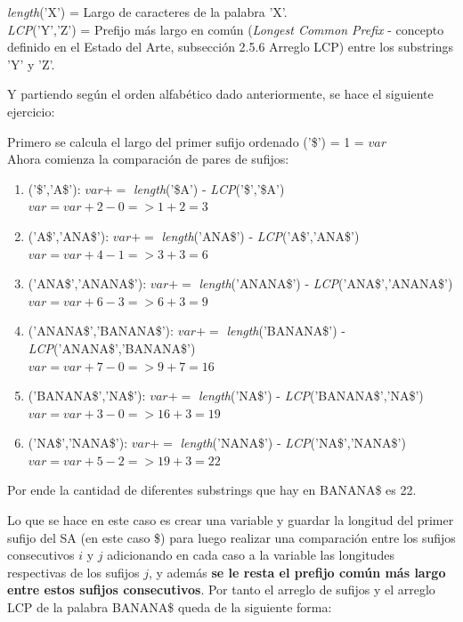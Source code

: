 {\it{length}}('X') = Largo de caracteres de la palabra 'X'.\\
{\it{LCP}}('Y','Z') = Prefijo más largo en común ({\it{Longest Common Prefix}} - concepto definido en el Estado del Arte, subsección 2.5.6 Arreglo LCP) entre los substrings 'Y' y 'Z'.

Y partiendo según el orden alfabético dado anteriormente, se hace el siguiente ejercicio:

Primero se calcula el largo del primer sufijo ordenado ('\$') = 1 = $var$\\
Ahora comienza la comparación de pares de sufijos:
\begin{enumerate}
	\item ('\$','A\$'): $var +=$ {\it{length}}('\$A') - {\it{LCP}}('\$','\$A')\\
	$var=var+2-0 =>  1+2=3$

	\item ('A\$','ANA\$'): $var +=$ {\it{length}}('ANA\$') - {\it{LCP}}('A\$','ANA\$')\\
	$var=var+4-1 =>  3+3=6$
	
	\item ('ANA\$','ANANA\$'): $var +=$ {\it{length}}('ANANA\$') - {\it{LCP}}('ANA\$','ANANA\$')\\
	$var=var+6-3 =>  6+3=9$
	
	\item ('ANANA\$','BANANA\$'): $var +=$ {\it{length}}('BANANA\$') - {\it{LCP}}('ANANA\$','BANANA\$')\\
	$var=var+7-0 =>  9+7=16$
	
	\item ('BANANA\$','NA\$'): $var +=$ {\it{length}}('NA\$') - {\it{LCP}}('BANANA\$','NA\$')\\
	$var=var+3-0 =>  16+3=19$
	
	\item ('NA\$','NANA\$'): $var +=$ {\it{length}}('NANA\$') - {\it{LCP}}('NA\$','NANA\$')\\
	$var=var+5-2 =>  19+3=22$
	
\end{enumerate}

Por ende la cantidad de diferentes substrings que hay en BANANA\$ es 22.

Lo que se hace en este caso es crear una variable y guardar la longitud del primer sufijo del SA (en este caso \$) para luego realizar una comparación entre los sufijos consecutivos $i$ y $j$ adicionando en cada caso a la variable las longitudes respectivas de los sufijos $j$, y además \textbf{se le resta el prefijo común más largo entre estos sufijos consecutivos}. Por tanto el arreglo de sufijos y el arreglo LCP de la palabra BANANA\$ queda de la siguiente forma:

